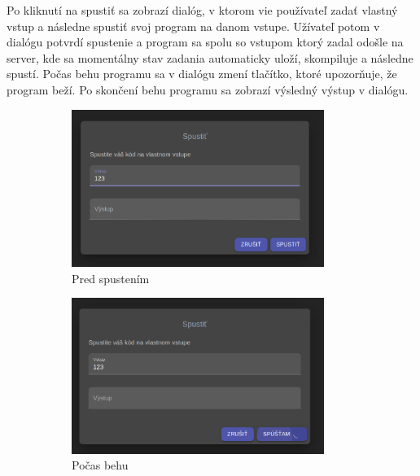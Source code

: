 Po kliknutí na spustiť sa zobrazí dialóg, v ktorom vie používateľ zadať vlastný vstup a následne 
spustiť svoj program na danom vstupe. Užívateľ potom v dialógu potvrdí spustenie a program sa spolu
so vstupom ktorý zadal odošle na server, kde sa momentálny stav zadania automaticky uloží,
skompiluje a následne spustí. Počas behu programu sa v dialógu zmení tlačítko, ktoré upozorňuje, že
program beží. Po skončení behu programu sa zobrazí výsledný výstup v dialógu.
\begin{figure}[H]
\centering
\begin{subfigure}{.3\textwidth}
  \centering
  \includegraphics[width=0.9\textwidth]{images/spusti_dialog}
  \caption[Pred spustením]{Pred spustením}
  \label{obr:spusti_dialog}
\end{subfigure}%
\begin{subfigure}{.3\textwidth}
  \centering
  \includegraphics[width=0.9\textwidth]{images/spusti_dialog_beh}
  \caption[Počas behu]{Počas behu}
  \label{obr:spusti_dialog_beh}
\end{subfigure}
\begin{subfigure}{.3\textwidth}
  \centering

\end{subfigure}
\end{figure}

